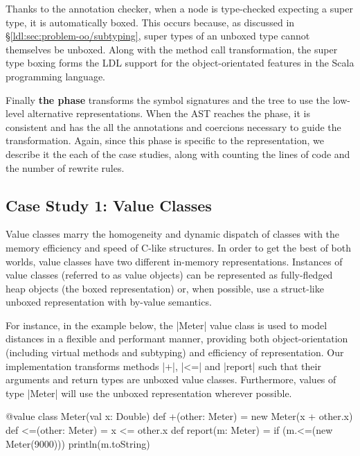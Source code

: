 Thanks to the annotation checker, when a node is type-checked expecting a super type, it is automatically boxed. This occurs because, as discussed in \S\ref{ldl:sec:problem-oo/subtyping}, super types of an unboxed type cannot themselves be unboxed. Along with the method call transformation, the super type boxing forms the LDL support for the object-orientated features in the Scala programming language.

Finally \textbf{the \commit{} phase} transforms the symbol signatures and the tree to use the low-level alternative representations. When the AST reaches the \commit{} phase, it is consistent and has the all the annotations and coercions necessary to guide the transformation. Again, since this phase is specific to the representation, we describe it the each of the case studies, along with counting the lines of code and the number of rewrite rules.

\subsection{Case Study 1: Value Classes}
\label{ldl:sec:validation/value-classes}

Value classes \cite{gosling-value-classes, dot-net-value-types-www, sip-value-classes} marry the homogeneity and dynamic dispatch of classes with the memory efficiency and speed of C-like structures. In order to get the best of both worlds, value classes have two different in-memory representations. Instances of value classes (referred to as value objects) can be represented as fully-fledged heap objects (the boxed representation) or, when possible, use a struct-like unboxed representation with by-value semantics.

For instance, in the example below, the |Meter| value class is used to model distances in a flexible and performant manner, providing both object-orientation (including virtual methods and subtyping) and efficiency of representation. Our implementation transforms methods |+|, |<=| and |report| such that their arguments and return types are unboxed value classes. Furthermore, values of type |Meter| will use the unboxed representation wherever possible.

\begin{lstlisting-nobreak}
 @value class Meter(val x: Double) {
   def +(other: Meter) = new Meter(x + other.x)
   def <=(other: Meter) = x <= other.x
 }
 def report(m: Meter) = {
   if (m.<=(new Meter(9000)))
     println(m.toString)
 }
\end{lstlisting-nobreak}


